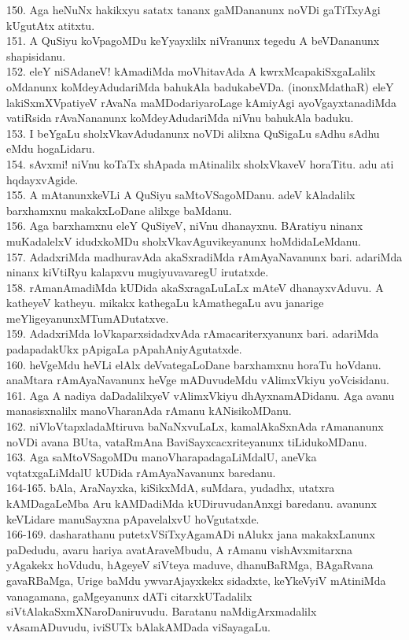 \documentclass{article}
\begin{document}
150. Aga heNuNx hakikxyu satatx tananx gaMDananunx noVDi gaTiTxyAgi kUgutAtx atitxtu.\\
151. A QuSiyu koVpagoMDu keYyayxlilx niVranunx tegedu A beVDananunx shapisidanu.\\
152. eleY niSAdaneV! kAmadiMda moVhitavAda A kwrxMcapakiSxgaLalilx oMdanunx koMdeyAdudariMda bahukAla badukabeVDa. (inonxMdathaR) eleY lakiSxmXVpatiyeV rAvaNa maMDodariyaroLage kAmiyAgi ayoVgayxtanadiMda vatiRsida rAvaNananunx koMdeyAdudariMda niVnu bahukAla baduku.\\
153. I beYgaLu sholxVkavAdudanunx noVDi alilxna QuSigaLu sAdhu sAdhu eMdu hogaLidaru.\\
154. sAvxmi! niVnu koTaTx shApada mAtinalilx sholxVkaveV horaTitu. adu ati hqdayxvAgide.\\
155. A mAtanunxkeVLi A QuSiyu saMtoVSagoMDanu. adeV kAladalilx barxhamxnu makakxLoDane alilxge baMdanu.\\
156. Aga barxhamxnu eleY QuSiyeV, niVnu dhanayxnu. BAratiyu ninanx muKadalelxV idudxkoMDu sholxVkavAguvikeyanunx hoMdidaLeMdanu.\\
157. AdadxriMda madhuravAda akaSxradiMda rAmAyaNavanunx bari. adariMda ninanx kiVtiRyu kalapxvu mugiyuvavaregU irutatxde.\\
158. rAmanAmadiMda kUDida akaSxragaLuLaLx mAteV dhanayxvAduvu. A katheyeV katheyu. mikakx kathegaLu kAmathegaLu avu janarige meYligeyanunxMTumADutatxve.\\
159. AdadxriMda loVkaparxsidadxvAda rAmacariterxyanunx bari. adariMda padapadakUkx pApigaLa pApahAniyAgutatxde.\\
160. heVgeMdu heVLi elAlx deVvategaLoDane barxhamxnu horaTu hoVdanu. anaMtara rAmAyaNavanunx heVge mADuvudeMdu vAlimxVkiyu yoVcisidanu.\\
161. Aga A nadiya daDadalilxyeV vAlimxVkiyu dhAyxnamADidanu. Aga avanu manasisxnalilx manoVharanAda rAmanu kANisikoMDanu.\\
162. niVloVtapxladaMtiruva baNaNxvuLaLx, kamalAkaSxnAda rAmananunx noVDi avana BUta, vataRmAna BaviSayxcacxriteyanunx tiLidukoMDanu.\\
163. Aga saMtoVSagoMDu manoVharapadagaLiMdalU, aneVka vqtatxgaLiMdalU kUDida rAmAyaNavanunx baredanu.\\
164-165. bAla, AraNayxka, kiSikxMdA, suMdara, yudadhx, utatxra kAMDagaLeMba Aru kAMDadiMda kUDiruvudanAnxgi baredanu. avanunx keVLidare manuSayxna pApavelalxvU hoVgutatxde.\\
166-169. dasharathanu putetxVSiTxyAgamADi nAlukx jana makakxLanunx paDedudu, avaru hariya avatAraveMbudu, A rAmanu vishAvxmitarxna yAgakekx hoVdudu, hAgeyeV siVteya maduve, dhanuBaRMga, BAgaRvana gavaRBaMga, Urige baMdu ywvarAjayxkekx sidadxte, keYkeVyiV mAtiniMda vanagamana, gaMgeyanunx dATi citarxkUTadalilx siVtAlakaSxmXNaroDaniruvudu. Baratanu naMdigArxmadalilx vAsamADuvudu, iviSUTx bAlakAMDada viSayagaLu.\\
\end{document}
